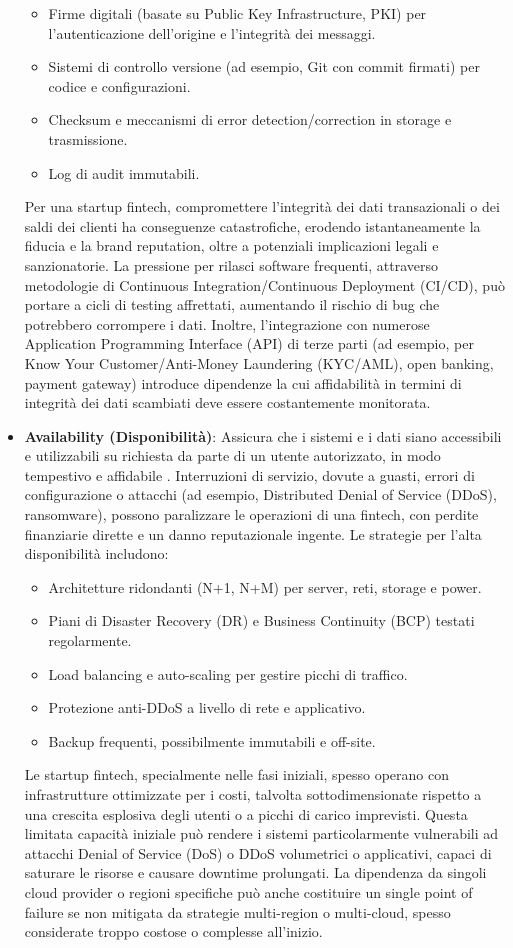 \begin{itemize}
\begin{itemize}
\item Firme digitali (basate su Public Key Infrastructure, PKI) per l'autenticazione dell'origine e l'integrità dei messaggi.
\item Sistemi di controllo versione (ad esempio, Git con commit firmati) per codice e configurazioni.
\item Checksum e meccanismi di error detection/correction in storage e trasmissione.
\item Log di audit immutabili.
\end{itemize}
Per una startup fintech, compromettere l'integrità dei dati transazionali o dei saldi dei clienti ha conseguenze catastrofiche, erodendo istantaneamente la fiducia e la brand reputation, oltre a potenziali implicazioni legali e sanzionatorie. La pressione per rilasci software frequenti, attraverso metodologie di Continuous Integration/Continuous Deployment (CI/CD), può portare a cicli di testing affrettati, aumentando il rischio di bug che potrebbero corrompere i dati. Inoltre, l'integrazione con numerose Application Programming Interface (API) di terze parti (ad esempio, per Know Your Customer/Anti-Money Laundering (KYC/AML), open banking, payment gateway) introduce dipendenze la cui affidabilità in termini di integrità dei dati scambiati deve essere costantemente monitorata.
\item \textbf{Availability (Disponibilità)}: Assicura che i sistemi e i dati siano accessibili e utilizzabili su richiesta da parte di un utente autorizzato, in modo tempestivo e affidabile \cite{NIST_SP_1800_26}. Interruzioni di servizio, dovute a guasti, errori di configurazione o attacchi (ad esempio, Distributed Denial of Service (DDoS), ransomware), possono paralizzare le operazioni di una fintech, con perdite finanziarie dirette e un danno reputazionale ingente. Le strategie per l'alta disponibilità includono:
\begin{itemize}
\item Architetture ridondanti (N+1, N+M) per server, reti, storage e power.
\item Piani di Disaster Recovery (DR) e Business Continuity (BCP) testati regolarmente.
\item Load balancing e auto-scaling per gestire picchi di traffico.
\item Protezione anti-DDoS a livello di rete e applicativo.
\item Backup frequenti, possibilmente immutabili e off-site.
\end{itemize}
Le startup fintech, specialmente nelle fasi iniziali, spesso operano con infrastrutture ottimizzate per i costi, talvolta sottodimensionate rispetto a una crescita esplosiva degli utenti o a picchi di carico imprevisti. Questa limitata capacità iniziale può rendere i sistemi particolarmente vulnerabili ad attacchi Denial of Service (DoS) o DDoS volumetrici o applicativi, capaci di saturare le risorse e causare downtime prolungati. La dipendenza da singoli cloud provider o regioni specifiche può anche costituire un single point of failure se non mitigata da strategie multi-region o multi-cloud, spesso considerate troppo costose o complesse all'inizio.
\end{itemize}
